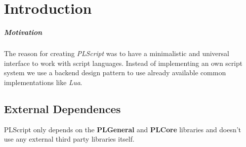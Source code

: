 \chapter{Introduction}


\paragraph{Motivation}
The reason for creating \emph{PLScript} was to have a minimalistic and universal interface to work with script languages. Instead of implementing an own script system we use a backend design pattern to use already available common implementations like \emph{Lua}.


\section{External Dependences}
PLScript only depends on the \textbf{PLGeneral} and \textbf{PLCore} libraries and doesn't use any external third party libraries itself.

